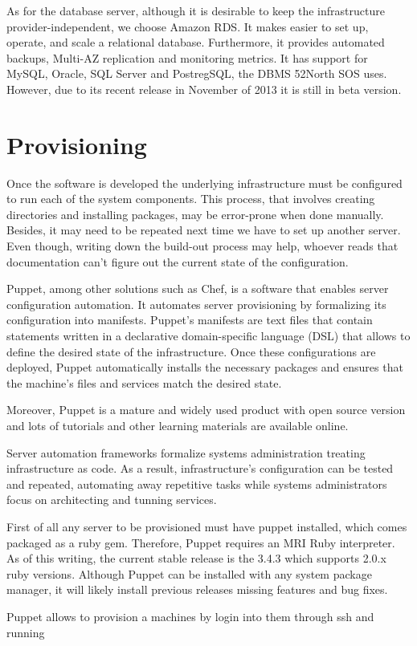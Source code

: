 As for the database server, although it is desirable to keep the infrastructure provider-independent, we choose Amazon RDS. It makes easier to set up, operate, and scale a relational database. Furthermore, it provides automated backups, Multi-AZ replication and monitoring metrics. It has support for MySQL, Oracle, SQL Server and PostregSQL, the DBMS 52North SOS uses. However, due to its recent release in November of 2013 it is still in beta version.

\section{Provisioning}

Once the software is developed the underlying infrastructure must be configured to run each of the system components. This process, that involves creating directories and installing packages, may be error-prone when done manually. Besides, it may need to be repeated next time we have to set up another server. Even though, writing down the build-out process may help, whoever reads that documentation can't figure out the current state of the configuration.

Puppet, among other solutions such as Chef, is a software that enables server configuration automation. It automates server provisioning by formalizing its configuration into manifests. Puppet's manifests are text files that contain statements written in a declarative domain-specific language (DSL) that allows to define the desired state of the infrastructure. Once these configurations are deployed, Puppet automatically installs the necessary packages and ensures that the machine’s files and services match the desired state.

Moreover, Puppet is a mature and widely used product with open source version and lots of tutorials and other learning materials are available online.

Server automation frameworks formalize systems administration treating infrastructure as code. As a result, infrastructure's configuration can be tested and repeated, automating away repetitive tasks while systems administrators focus on architecting and tunning services.

First of all any server to be provisioned must have puppet installed, which comes packaged as a ruby gem. Therefore, Puppet requires an MRI Ruby interpreter. As of this writing, the current stable release is the 3.4.3 which supports 2.0.x ruby versions. Although Puppet can be installed with any system package manager, it will likely install previous releases missing features and bug fixes.

Puppet allows to provision a machines by login into them through ssh and running


